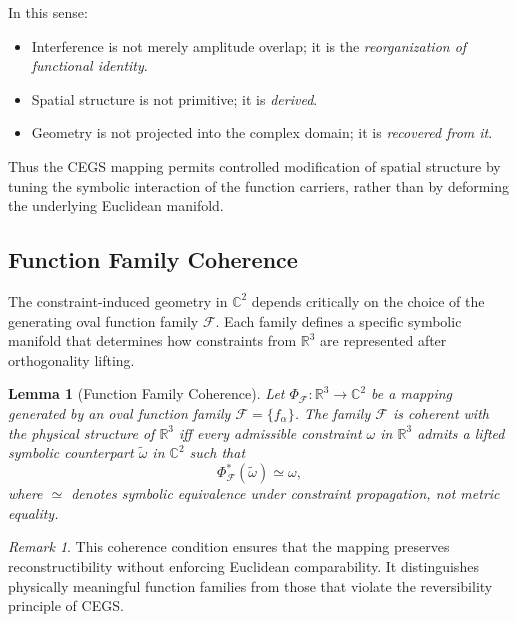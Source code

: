 \documentclass[11pt]{article}
\theoremstyle{plain}
\newtheorem{lemma}{Lemma}[section]
\theoremstyle{definition}
\theoremstyle{remark}
\newtheorem{remark}{Remark}[section]
\begin{document}
\medskip
\noindent In this sense:

\begin{itemize}[leftmargin=*,itemsep=4pt]
\item Interference is not merely amplitude overlap; it is the \emph{reorganization of functional identity}.
\item Spatial structure is not primitive; it is \emph{derived}.
\item Geometry is not projected into the complex domain; it is \emph{recovered from it}.
\end{itemize}

\medskip
\noindent Thus the CEGS mapping permits controlled modification of spatial structure by tuning the symbolic interaction of the function carriers, rather than by deforming the underlying Euclidean manifold.



\subsection*{Function Family Coherence}

The constraint-induced geometry in $\mathbb{C}^2$ depends critically on the
choice of the generating oval function family $\mathcal{F}$. 
Each family defines a specific symbolic manifold that determines how
constraints from $\mathbb{R}^3$ are represented after orthogonality lifting.

\begin{lemma}[Function Family Coherence]
Let $\Phi_{\mathcal{F}} : \mathbb{R}^3 \to \mathbb{C}^2$ be a mapping generated by
an oval function family $\mathcal{F} = \{ f_\alpha \}$.
The family $\mathcal{F}$ is coherent with the physical structure of $\mathbb{R}^3$
iff every admissible constraint $\omega$ in $\mathbb{R}^3$ admits a lifted symbolic counterpart
$\tilde{\omega}$ in $\mathbb{C}^2$ such that
\[
\Phi_{\mathcal{F}}^\ast(\tilde{\omega}) \simeq \omega,
\]
where $\simeq$ denotes symbolic equivalence under constraint propagation,
not metric equality.
\end{lemma}

\begin{remark}
This coherence condition ensures that the mapping preserves reconstructibility
without enforcing Euclidean comparability. 
It distinguishes physically meaningful function families from those that violate
the reversibility principle of CEGS.
\end{remark}
\end{document}
